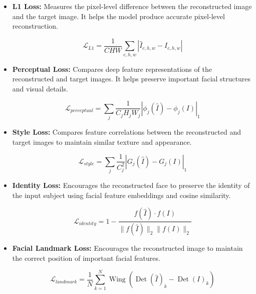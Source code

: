 \begin{itemize}

    \item \textbf{L1 Loss:} Measures the pixel-level difference between the
    reconstructed image and the target image. It helps the model produce
    accurate pixel-level reconstruction.

    \begin{equation}
    \mathcal{L}_{L1} =
    \frac{1}{CHW}
    \sum_{c,h,w}
    \left|
    \hat{I}_{c,h,w} - I_{c,h,w}
    \right|
    \end{equation}

    \item \textbf{Perceptual Loss:} Compares deep feature representations
    of the reconstructed and target images. It helps preserve important
    facial structures and visual details.

    \begin{equation}
    \mathcal{L}_{perceptual} =
    \sum_j
    \frac{1}{C_jH_jW_j}
    \left|
    \phi_j(\hat{I})-\phi_j(I)
    \right|_1
    \end{equation}

    \item \textbf{Style Loss:} Compares feature correlations between the
    reconstructed and target images to maintain similar texture and
    appearance.

    \begin{equation}
    \mathcal{L}_{style} =
    \sum_j
    \frac{1}{C_j^2}
    \left|
    G_j(\hat{I})-G_j(I)
    \right|_1
    \end{equation}

    \item \textbf{Identity Loss:} Encourages the reconstructed face to
    preserve the identity of the input subject using facial feature
    embeddings and cosine similarity.

    \begin{equation}
    \mathcal{L}_{identity} =
    1-
    \frac{
    f(\hat{I})\cdot f(I)
    }{
    \|f(\hat{I})\|_2\|f(I)\|_2
    }
    \end{equation}

    \item \textbf{Facial Landmark Loss:} Encourages the reconstructed
    image to maintain the correct position of important facial features.

    \begin{equation}
    \mathcal{L}_{landmark} =
    \frac{1}{N}
    \sum_{k=1}^{N}
    \operatorname{Wing}
    \left(
    \operatorname{Det}(\hat{I})_k-
    \operatorname{Det}(I)_k
    \right)
    \end{equation}


\end{itemize}
